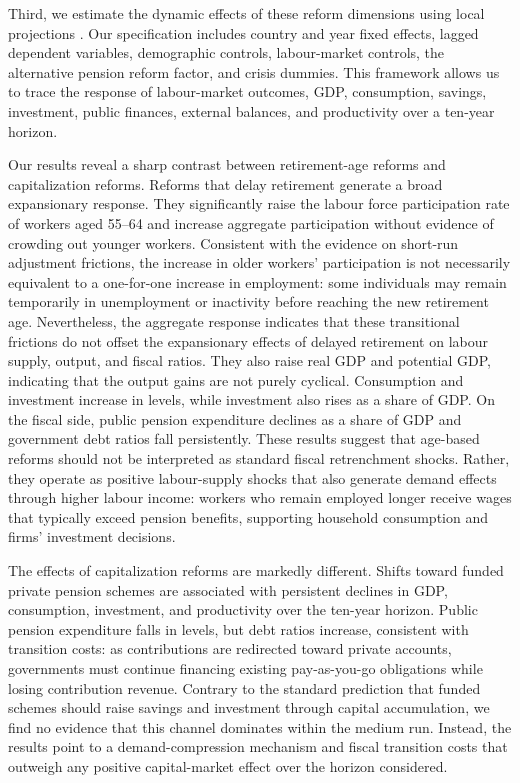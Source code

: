 \documentclass[11pt,english,a4paper, twoside, authoryear]{article}
\begin{document}
Third, we estimate the dynamic effects of these reform dimensions using local projections \citep{Jorda2005}. Our specification includes country and year fixed effects, lagged dependent variables, demographic controls, labour-market controls, the alternative pension reform factor, and crisis dummies. This framework allows us to trace the response of labour-market outcomes, GDP, consumption, savings, investment, public finances, external balances, and productivity over a ten-year horizon.

Our results reveal a sharp contrast between retirement-age reforms and capitalization reforms. Reforms that delay retirement generate a broad expansionary response. They significantly raise the labour force participation rate of workers aged 55--64 and increase aggregate participation without evidence of crowding out younger workers. Consistent with the evidence on short-run adjustment frictions, the increase in older workers' participation is not necessarily equivalent to a one-for-one increase in employment: some individuals may remain temporarily in unemployment or inactivity before reaching the new retirement age. Nevertheless, the aggregate response indicates that these transitional frictions do not offset the expansionary effects of delayed retirement on labour supply, output, and fiscal ratios. They also raise real GDP and potential GDP, indicating that the output gains are not purely cyclical. Consumption and investment increase in levels, while investment also rises as a share of GDP. On the fiscal side, public pension expenditure declines as a share of GDP and government debt ratios fall persistently. These results suggest that age-based reforms should not be interpreted as standard fiscal retrenchment shocks. Rather, they operate as positive labour-supply shocks that also generate demand effects through higher labour income: workers who remain employed longer receive wages that typically exceed pension benefits, supporting household consumption and firms' investment decisions.

The effects of capitalization reforms are markedly different. Shifts toward funded private pension schemes are associated with persistent declines in GDP, consumption, investment, and productivity over the ten-year horizon. Public pension expenditure falls in levels, but debt ratios increase, consistent with transition costs: as contributions are redirected toward private accounts, governments must continue financing existing pay-as-you-go obligations while losing contribution revenue. Contrary to the standard prediction that funded schemes should raise savings and investment through capital accumulation, we find no evidence that this channel dominates within the medium run. Instead, the results point to a demand-compression mechanism and fiscal transition costs that outweigh any positive capital-market effect over the horizon considered.
\end{document}
